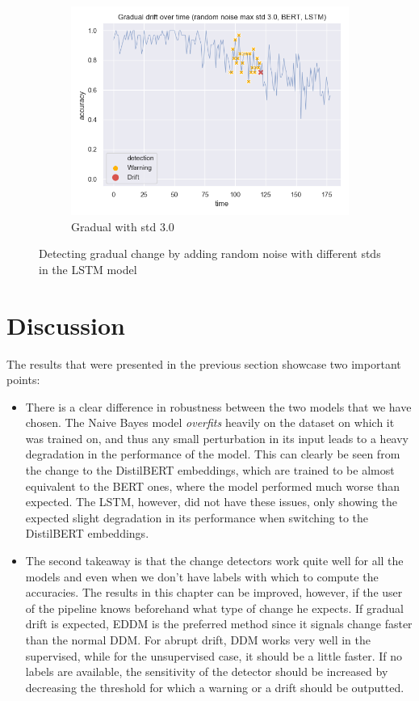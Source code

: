 \documentclass[12pt]{extreport}
\begin{document}
\begin{figure}[H]
\begin{subfigure}{.5\textwidth}
  \centering
  \includegraphics[width=\linewidth]{assets/detecting-change/gradual_noise_random_std_3_lstm_wos_1_BERT.png}
  \caption{Gradual with std 3.0}
  \label{fig:lstm-gradual-std-3}
\end{subfigure}
\caption{Detecting gradual change by adding random noise with different stds in the LSTM model}
\label{fig:lstm-gradual}
\end{figure}

\section{Discussion}

The results that were presented in the previous section showcase two important points:
\begin{itemize}
    \item There is a clear difference in robustness between the two models that we have chosen. The Naive Bayes model \emph{overfits} heavily on the dataset on which it was trained on, and thus any small perturbation in its input leads to a heavy degradation in the performance of the model. This can clearly be seen from the change to the DistilBERT embeddings, which are trained to be almost equivalent to the BERT ones, where the model performed much worse than expected. The LSTM, however, did not have these issues, only showing the expected slight degradation in its performance when switching to the DistilBERT embeddings.
    \item The second takeaway is that the change detectors work quite well for all the models and even when we don't have labels with which to compute the accuracies. The results in this chapter can be improved, however, if the user of the pipeline knows beforehand what type of change he expects. If gradual drift is expected, EDDM is the preferred method since it signals change faster than the normal DDM. For abrupt drift, DDM works very well in the supervised, while for the unsupervised case, it should be a little faster. If no labels are available, the sensitivity of the detector should be increased by decreasing the threshold for which a warning or a drift should be outputted.
\end{itemize}
\end{document}
